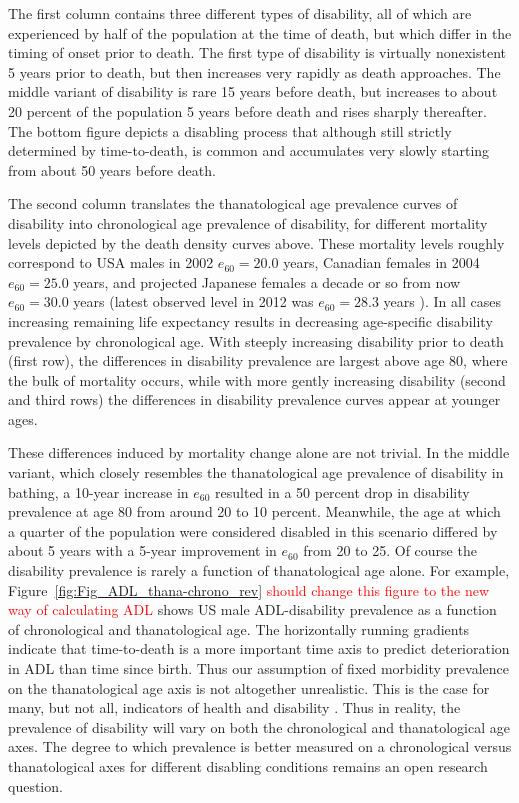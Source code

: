 \documentclass[11pt,oneside,a4paper]{article} %
\begin{document}
The first column contains three different types of disability, all of which are experienced by half of the population at the time of death, but which differ in the timing of onset prior to death. The first type of disability is virtually nonexistent 5 years prior to death, but then increases very rapidly as death approaches. The middle variant of disability is rare 15 years before death, but increases to about 20 percent of the population 5 years before death and rises sharply thereafter. The bottom figure depicts a disabling process that although still strictly determined by time-to-death, is common and accumulates very slowly starting from about 50 years before death. 

The second column translates the thanatological age prevalence curves of disability into chronological age prevalence of disability, for different mortality levels depicted by the death density curves above. These mortality levels roughly correspond to USA males in 2002 $e_{60} = 20.0$ years, Canadian females in 2004 $e_{60} = 25.0$ years, and projected Japanese females a decade or so from now $e_{60} = 30.0$ years (latest observed level in 2012 was $e_{60} = 28.3$ years \citep{HMD2015}).  In all cases increasing remaining life expectancy results in decreasing age-specific disability prevalence by chronological age.  With steeply increasing disability prior to death (first row), the differences in disability prevalence are largest above age 80, where the bulk of mortality occurs, while with more gently increasing disability (second and third rows) the differences in disability prevalence curves appear at younger ages. 

These differences induced by mortality change alone are not trivial. In the middle variant, which closely resembles the thanatological age prevalence of disability in bathing, a 10-year increase in $e_{60}$  resulted in a 50 percent drop in disability prevalence at age 80 from around 20 to 10 percent. Meanwhile, the age at which a quarter of the population were considered disabled in this scenario differed by about 5 years with a 5-year improvement in $e_{60}$ from 20 to 25.
Of course the disability prevalence is rarely a function of thanatological age alone. For example, Figure~\ref{fig:Fig_ADL_thana-chrono_rev} \textcolor{red}{should change this figure to the new way of calculating ADL} shows US male ADL-disability prevalence as a function of chronological and thanatological age. The horizontally running gradients indicate that time-to-death is a more important time axis to predict deterioration in ADL than time since birth. Thus our assumption of fixed morbidity prevalence on the thanatological age axis is not altogether unrealistic. This is the case for many, but not all, indicators of health and disability \citep{riffe2015ttd}. Thus in reality, the prevalence of disability will vary on both the chronological and thanatological age axes. The degree to which prevalence is better measured on a chronological versus thanatological axes for different disabling conditions remains an open research question.
\end{document}
